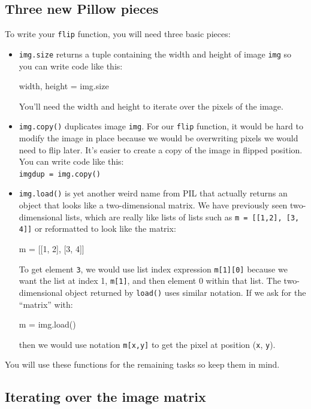 \subsection{Three new Pillow pieces}

To write your {\tt flip} function, you will need three basic pieces:

\begin{itemize}
\item {\tt img.size} returns a tuple containing the width and height of image {\tt img} so you can write code like this:
\begin{pyverbatim}
width, height = img.size
\end{pyverbatim}
You'll need the width and height to iterate over the pixels of the image.

\item {\tt img.copy()} duplicates image {\tt img}.  For our {\tt flip} function, it would be hard to modify the image in place because we would be overwriting pixels we would need to flip later. It's easier to create a copy of the image in flipped position. You can write code like this:\\
{\tt imgdup = img.copy()}

\item {\tt img.load()} is yet another weird name from PIL that actually returns an object that looks like a two-dimensional matrix. We have previously seen two-dimensional lists, which are really like lists of lists such as {\tt m = [[1,2], [3, 4]]} or reformatted to look like the matrix:
\begin{pyverbatim}
m = [[1, 2],
     [3, 4]]
\end{pyverbatim}
To get element {\tt 3}, we would use list index expression {\tt m[1][0]} because we want the list at index 1, {\tt m[1]}, and then element 0 within that list. The two-dimensional object returned by {\tt load()} uses similar notation. If we ask for the ``matrix'' with:
\begin{pyverbatim}
m = img.load()
\end{pyverbatim}
then we would use notation {\tt m[x,y]} to get the pixel at position ({\tt x}, {\tt y}).
\end{itemize}

You will use these functions for the remaining tasks so keep them in mind.

\subsection{Iterating over the image matrix}


